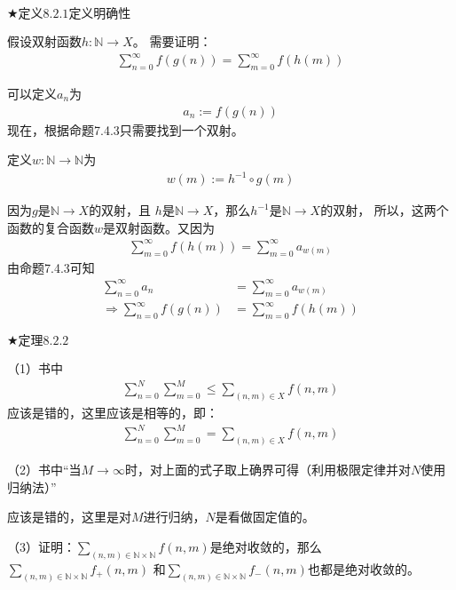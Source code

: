 \documentclass{article}
\begin{document}
$\bigstar \textbf{定义}8.2.1 \textbf{定义明确性}$

假设双射函数$h: \mathbb{N} \rightarrow X$。
需要证明：
\begin{align*}
    \sum \limits_{n=0}^\infty f(g(n)) = \sum \limits_{m=0}^\infty f(h(m))
\end{align*}

可以定义$a_n$为
\begin{align*}
    a_n := f(g(n))
\end{align*}
现在，根据命题7.4.3只需要找到一个双射。

定义$w: \mathbb{N} \rightarrow \mathbb{N}$为
\begin{align*}
    w(m) := h^{-1} \circ g(m)
\end{align*}

因为$g$是$\mathbb{N} \rightarrow X$的双射，且
$h$是$\mathbb{N} \rightarrow X$，那么$h^{-1}$是$\mathbb{N} \rightarrow X$的双射，
所以，这两个函数的复合函数$w$是双射函数。又因为
\begin{align*}
    \sum \limits_{m=0}^\infty f(h(m)) = \sum \limits_{m=0}^\infty a_{w(m)}
\end{align*}
由命题7.4.3可知
\begin{align*}
    \sum \limits_{n=0}^\infty a_n                 & = \sum \limits_{m=0}^\infty a_{w(m)} \\
    \Rightarrow \sum \limits_{n=0}^\infty f(g(n)) & = \sum \limits_{m=0}^\infty f(h(m))
\end{align*}


$\bigstar \textbf{定理}8.2.2$

（1）书中
\begin{align*}
    \sum \limits_{n=0}^N \sum \limits_{m=0}^M \leq \sum \limits_{(n,m) \in X}f(n,m)
\end{align*}
应该是错的，这里应该是相等的，即：
\begin{align*}
    \sum \limits_{n=0}^N \sum \limits_{m=0}^M = \sum \limits_{(n,m) \in X}f(n,m)
\end{align*}

（2）书中“当$M \rightarrow \infty$时，对上面的式子取上确界可得（利用极限定律并对$N$使用归纳法）”

应该是错的，这里是对$M$进行归纳，$N$是看做固定值的。

（3）证明：$\sum \limits_{(n,m) \in \mathbb{N} \times \mathbb{N}}f(n,m)$是绝对收敛的，那么
$\sum \limits_{(n,m) \in \mathbb{N} \times \mathbb{N}}f_{+}(n,m)$
和$\sum \limits_{(n,m) \in \mathbb{N} \times \mathbb{N}}f_{-}(n,m)$也都是绝对收敛的。
\end{document}
